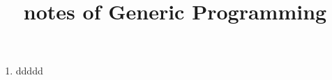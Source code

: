 \documentclass[UTF8]{article}
\title{notes of Generic Programming}
\author{}
\begin{document}
   \begin{enumerate}
       \item ddddd
   \end{enumerate}
\end{document}
